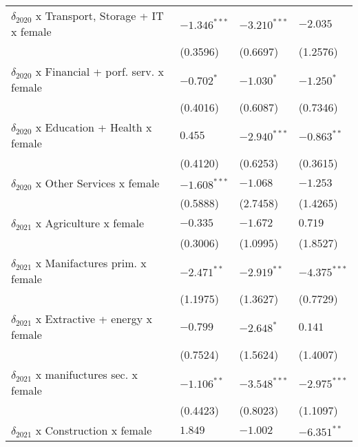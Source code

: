 \begin{tabular}{llll}
$\delta_{2020}$ x Transport, Storage + IT x female &     $-1.346^{***}$ &     $-3.210^{***}$ &           $-2.035$ \\
                                                   &           (0.3596) &           (0.6697) &           (1.2576) \\
$\delta_{2020}$ x Financial + porf. serv. x female &         $-0.702^*$ &         $-1.030^*$ &         $-1.250^*$ \\
                                                   &           (0.4016) &           (0.6087) &           (0.7346) \\
$\delta_{2020}$ x Education + Health x female      &            $0.455$ &     $-2.940^{***}$ &      $-0.863^{**}$ \\
                                                   &           (0.4120) &           (0.6253) &           (0.3615) \\
$\delta_{2020}$ x Other Services x female          &     $-1.608^{***}$ &           $-1.068$ &           $-1.253$ \\
                                                   &           (0.5888) &           (2.7458) &           (1.4265) \\
$\delta_{2021}$ x Agriculture x female             &           $-0.335$ &           $-1.672$ &            $0.719$ \\
                                                   &           (0.3006) &           (1.0995) &           (1.8527) \\
$\delta_{2021}$ x Manifactures prim. x female      &      $-2.471^{**}$ &      $-2.919^{**}$ &     $-4.375^{***}$ \\
                                                   &           (1.1975) &           (1.3627) &           (0.7729) \\
$\delta_{2021}$ x Extractive + energy x female     &           $-0.799$ &         $-2.648^*$ &            $0.141$ \\
                                                   &           (0.7524) &           (1.5624) &           (1.4007) \\
$\delta_{2021}$ x manifuctures sec. x female       &      $-1.106^{**}$ &     $-3.548^{***}$ &     $-2.975^{***}$ \\
                                                   &           (0.4423) &           (0.8023) &           (1.1097) \\
$\delta_{2021}$ x Construction x female            &            $1.849$ &           $-1.002$ &      $-6.351^{**}$ \\

\end{tabular}
